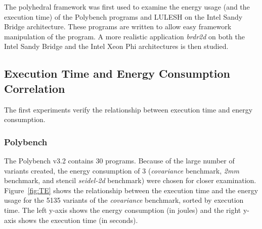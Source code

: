 The polyhedral framework was first used to examine the energy usage (and the execution time) of
the Polybench programs and LULESH on the Intel Sandy Bridge
architecture. These programs are
written to allow easy framework manipulation of the program. 
A more realistic application \emph{brdr2d} on both the Intel Sandy Bridge
and the Intel Xeon Phi architectures is then studied.

\subsection{Execution Time and Energy Consumption Correlation}
The first experiments verify the relationship between execution time and energy consumption.

\subsubsection{Polybench}
The Polybench v3.2 contains 30 programs. Because of the large number of variants
created, the energy consumption of 3 (\emph{covariance} benchmark, \emph{2mm} benchmark,
and stencil \emph{seidel-2d} benchmark) were chosen for closer examination.
Figure~\ref{fig:TE} shows the relationship between the execution time and the 
energy usage for the 5135 variants of the \emph{covariance} benchmark, sorted by execution time.
The left y-axis shows the energy consumption (in joules) and the right y-axis shows the 
execution time (in seconds).

